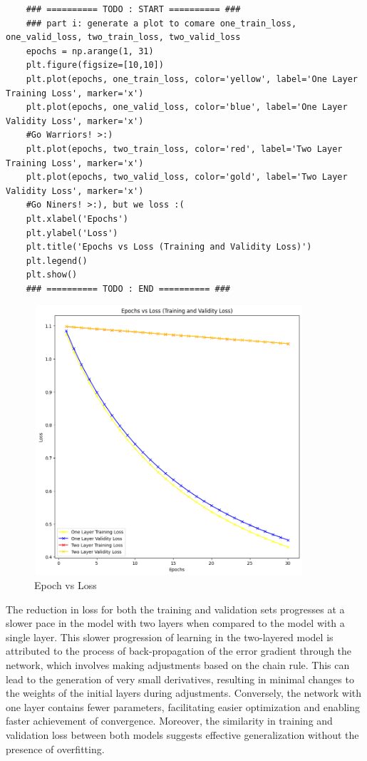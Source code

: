 \documentclass[10pt]{article}
\begin{document}
\begin{verbatim}
    ### ========== TODO : START ========== ###
    ### part i: generate a plot to comare one_train_loss, one_valid_loss, two_train_loss, two_valid_loss
    epochs = np.arange(1, 31)
    plt.figure(figsize=[10,10])
    plt.plot(epochs, one_train_loss, color='yellow', label='One Layer Training Loss', marker='x')
    plt.plot(epochs, one_valid_loss, color='blue', label='One Layer Validity Loss', marker='x')
    #Go Warriors! >:)
    plt.plot(epochs, two_train_loss, color='red', label='Two Layer Training Loss', marker='x')
    plt.plot(epochs, two_valid_loss, color='gold', label='Two Layer Validity Loss', marker='x')
    #Go Niners! >:), but we loss :(
    plt.xlabel('Epochs')
    plt.ylabel('Loss')
    plt.title('Epochs vs Loss (Training and Validity Loss)')
    plt.legend()
    plt.show()
    ### ========== TODO : END ========== ###
\end{verbatim}

\begin{figure}
    \centering
    \includegraphics[width= 10cm, height = 10cm]{images/4i.png}
    \caption{Epoch vs Loss}
    \label{fig:enter-label}
\end{figure}

The reduction in loss for both the training and validation sets progresses at a slower pace in the model with two layers when compared to the model with a single layer. This slower progression of learning in the two-layered model is attributed to the process of back-propagation of the error gradient through the network, which involves making adjustments based on the chain rule. This can lead to the generation of very small derivatives, resulting in minimal changes to the weights of the initial layers during adjustments. Conversely, the network with one layer contains fewer parameters, facilitating easier optimization and enabling faster achievement of convergence. Moreover, the similarity in training and validation loss between both models suggests effective generalization without the presence of overfitting. \\
\end{document}
